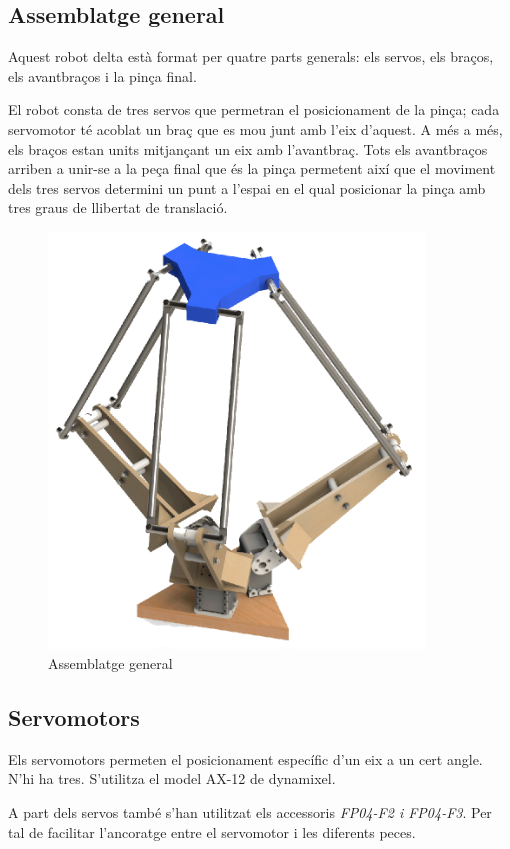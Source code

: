 \subsection{Assemblatge general}

Aquest robot delta està format per quatre parts generals: els servos, els braços, els avantbraços i la pinça final. 

El robot consta de tres servos que permetran el posicionament de la pinça; cada servomotor té acoblat un braç que es mou junt amb l'eix d'aquest. A més a més, els
braços estan units mitjançant un eix amb l'avantbraç. Tots els avantbraços arriben a unir-se a la peça final que és la pinça permetent així que el moviment dels tres servos determini un punt a l'espai en el qual posicionar la pinça amb tres graus de llibertat de translació.

\begin{figure}[h!]
\centering
\includegraphics[width=10cm]{./imgComp/general}
\caption{Assemblatge general}
\end{figure}



\newpage
\subsection{Servomotors}
Els servomotors permeten el posicionament específic d'un eix a un cert angle. N'hi ha tres. S'utilitza el model AX-12 de dynamixel. 

A part dels servos també s'han utilitzat els accessoris \emph{FP04-F2 i FP04-F3}. Per tal de facilitar l'ancoratge entre el servomotor i les diferents peces.


